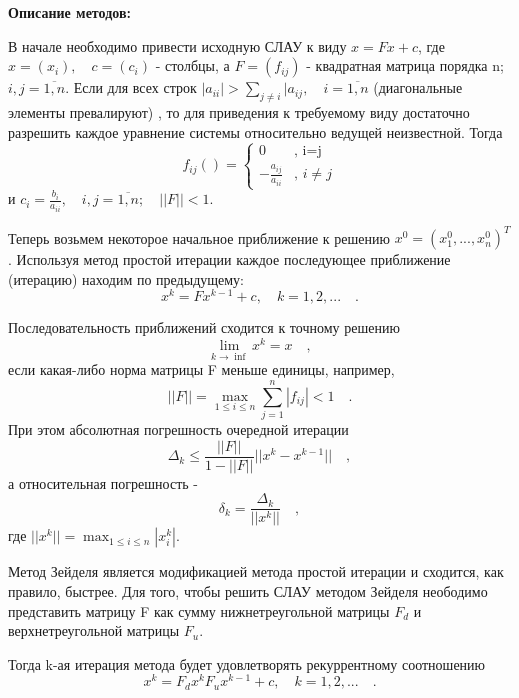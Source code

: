 \documentclass [12pt]{article}
\begin{document}
\textbf{Описание методов:}

В начале необходимо привести исходную СЛАУ к виду $x = Fx + c$, где $x = (x_{i}), \quad c = (c_{i})$ - столбцы, а $F = (f_{ij})$ - квадратная матрица порядка n; $i,j=\overline{1,n}$. Если для всех строк $|a_{ii}| > \sum\limits_{j \neq i}{|a_{ij}}, \quad i = \overline{1,n}$ (диагональные элементы превалируют) , то для приведения к требуемому виду достаточно разрешить каждое уравнение системы относительно ведущей неизвестной. Тогда 
\begin{equation*}
    f_{ij}() = 
    \begin{cases}
       0 &\text{, i=j}\\
       -\frac{a_{ij}}{a_{ii}} &\text{, $i \neq j$}
    \end{cases}
\end{equation*}     
и $ c_{i} = \frac{b_{i}}{a_{ii}}, \quad i,j = \overline{1,n}; \quad ||F|| < 1 $.

Теперь возьмем некоторое начальное приближение к решению $x^0 = (x_{1}^0,...,x_{n}^0)^T$. Используя метод простой итерации каждое последующее приближение (итерацию) находим по предыдущему: $$ x^k = Fx^{k-1} + c, \quad k = 1,2,... \quad .$$

Последовательность приближений сходится к точному решению $$ \lim_{k\to \inf} x^k = x \quad,$$ если какая-либо норма матрицы F меньше единицы, например, $$ ||F|| = \max_{1 \leq i \leq n} \sum_{j = 1}^{n} |f_{ij}| < 1 \quad .$$
При этом абсолютная погрешность очередной итерации $$ \Delta_{k} \leq \frac{||F||}{1 - ||F||}||x^k - x^{k-1}|| \quad ,$$ а относительная погрешность - $$ \delta_{k} = \frac{\Delta_{k}}{||x^k||} \quad ,$$ где $ ||x^k|| = \max_{1 \leq i \leq n} |x_{i}^k|$.


Метод Зейделя является модификацией метода простой итерации и сходится, как правило, быстрее. Для того, чтобы решить СЛАУ методом Зейделя неободимо представить матрицу F как сумму нижнетреугольной матрицы $F_{d}$ и верхнетреугольной матрицы $F_{u}$.

Тогда k-ая итерация метода будет удовлетворять рекуррентному соотношению $$ x^k = F_{d}x^k F_{u}x^{k-1} + c, \quad k = 1,2,... \quad .$$
\end{document}
